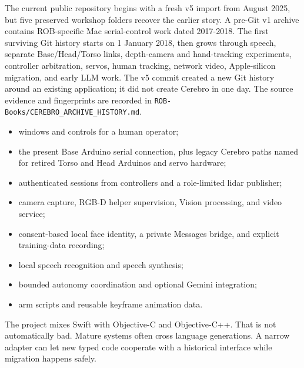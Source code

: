 \documentclass[11pt,openany]{book}
\begin{document}
\begin{fieldnotebox}[title={CEREBRO EXISTED BEFORE THE V5 GIT RESET}]
The current public repository begins with a fresh v5 import from August 2025, but five preserved workshop folders recover the earlier story. A pre-Git v1 archive contains ROB-specific Mac serial-control work dated 2017-2018. The first surviving Git history starts on 1 January 2018, then grows through speech, separate Base/Head/Torso links, depth-camera and hand-tracking experiments, controller arbitration, servos, human tracking, network video, Apple-silicon migration, and early LLM work. The v5 commit created a new Git history around an existing application; it did not create Cerebro in one day. The source evidence and fingerprints are recorded in \texttt{ROB-Books/CEREBRO\_ARCHIVE\_HISTORY.md}.
\end{fieldnotebox}

\begin{itemize}
  \item windows and controls for a human operator;
  \item the present Base Arduino serial connection, plus legacy Cerebro paths named for retired Torso and Head Arduinos and servo hardware;
  \item authenticated sessions from controllers and a role-limited lidar publisher;
  \item camera capture, RGB-D helper supervision, Vision processing, and video service;
  \item consent-based local face identity, a private Messages bridge, and explicit training-data recording;
  \item local speech recognition and speech synthesis;
  \item bounded autonomy coordination and optional Gemini integration;
  \item arm scripts and reusable keyframe animation data.
\end{itemize}

The project mixes Swift with Objective-C and Objective-C++. That is not automatically bad. Mature systems often cross language generations. A narrow adapter can let new typed code cooperate with a historical interface while migration happens safely.

\end{document}
